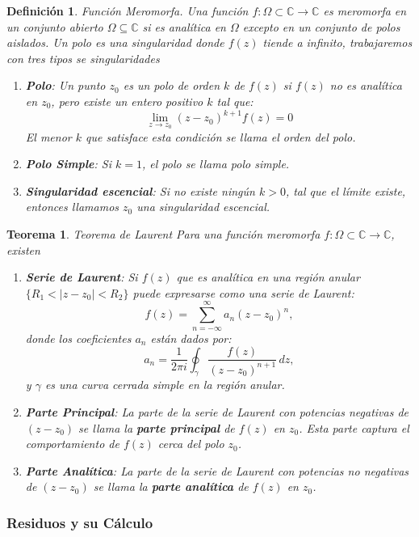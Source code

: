 \documentclass[letterpaper]{book}
\newtheorem{teorema}{Teorema}[section]
\newtheorem{def.}{Definici\'on}[section]
\newcommand{\om}{\ensuremath{\Omega}}
\newcommand{\co}{\ensuremath{\mathbb C }}
\begin{document}
\begin{def.}{Función Meromorfa.}
\noindent Una función \(f:\om\subset\co\to\co\) es \emph{meromorfa} en un conjunto abierto \(\om \subseteq \mathbb{C}\) si es analítica en \(\om\) excepto en un conjunto de polos aislados. Un polo es una singularidad donde \(f(z)\) tiende a infinito, trabajaremos con tres tipos se singularidades

\begin{enumerate}
\item \textbf{Polo}:
Un punto \(z_0\) es un \emph{polo} de orden \(k\) de \(f(z)\) si \(f(z)\) no es analítica en \(z_0\), pero existe un entero positivo \(k\) tal que:
\[
\lim_{z \to z_0} (z - z_0)^{k+1} f(z)=0
\]
El menor \(k\) que satisface esta condición se llama el \emph{orden} del polo.

\item \textbf{Polo Simple}: Si \(k = 1\), el polo se llama \emph{polo simple}.

\item \textbf{Singularidad escencial}: Si no existe  ningún \(k > 0\), tal que el límite existe, entonces llamamos \(z_0\) una \emph{singularidad escencial}.
\end{enumerate}
\end{def.}

\begin{teorema}{Teorema de Laurent}
Para una función meromorfa \(f:\om\subset\co\to\co\), existen
\begin{enumerate}
\item \textbf{Serie de Laurent}:
Si \(f(z)\) que es analítica en una región anular \(\{R_1 < |z - z_0| < R_2\}\) puede expresarse como una \emph{serie de Laurent}:
\[
f(z) = \sum_{n=-\infty}^\infty a_n (z - z_0)^n,
\]
donde los coeficientes \(a_n\) están dados por:
\[
a_n = \frac{1}{2\pi i} \oint_\gamma \frac{f(z)}{(z - z_0)^{n+1}} \, dz,
\]
y \(\gamma\) es una curva cerrada simple en la región anular.

\item \textbf{Parte Principal}:
La parte de la serie de Laurent con potencias negativas de \((z - z_0)\) se llama la \textbf{parte principal} de \(f(z)\) en \(z_0\). Esta parte captura el comportamiento de \(f(z)\) cerca del polo \(z_0\).

\item \textbf{Parte Analítica}:
La parte de la serie de Laurent con potencias no negativas de \((z - z_0)\) se llama la \textbf{parte analítica} de \(f(z)\) en \(z_0\).
\end{enumerate}
\end{teorema}
\noindent\subsubsection{Residuos y su Cálculo}
\end{document}
